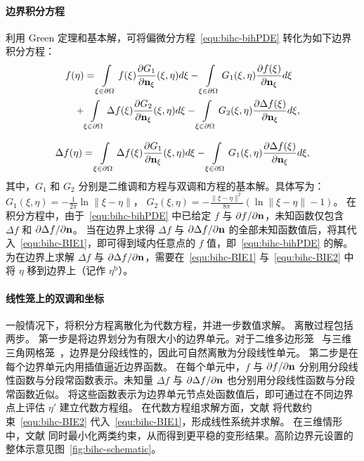 \paragraph{边界积分方程}
利用 Green 定理和基本解，可将偏微分方程~\eqref{equ:bihc-bihPDE} 转化为如下边界积分方程：
\begin{equation}\label{equ:bihc-BIE1}
\begin{aligned}
f(\eta) &=
\int\limits_{\xi \in \partial \Omega}
f(\xi) \frac{\partial G_1}{\partial \mathbf{n}_{\xi}}(\xi, \eta)d\xi -
\int\limits_{\xi \in \partial \Omega}
G_1(\xi, \eta) \frac{\partial f(\xi)}{\partial \mathbf{n}_{\xi}}d\xi \\
+ &\int\limits_{\xi \in \partial \Omega}
\Delta f(\xi) \frac{\partial G_2}{\partial \mathbf{n}_{\xi}}(\xi, \eta)d\xi -
\int\limits_{\xi \in \partial \Omega}
G_2(\xi, \eta) \frac{\partial \Delta f(\xi)}{\partial \mathbf{n}_{\xi}}d\xi,
\end{aligned}
\end{equation}

\begin{equation}\label{equ:bihc-BIE2}
\begin{aligned}
\Delta f(\eta) =
\int\limits_{\xi \in \partial \Omega}
\Delta f(\xi) \frac{\partial G_1}{\partial \mathbf{n}_{\xi}}(\xi, \eta)d\xi -
\int\limits_{\xi \in \partial \Omega}
G_1(\xi, \eta) \frac{\partial \Delta f(\xi)}{\partial \mathbf{n}_{\xi}}d\xi,
\end{aligned}
\end{equation}
其中，$G_1$ 和 $G_2$ 分别是二维调和方程与双调和方程的基本解。具体写为：
$G_1(\xi,\eta)=-\frac{1}{2 \pi}\ln\|\xi-\eta\|$，
$G_2(\xi,\eta)=-\frac{\|\xi-\eta\|^2}{8 \pi}(\ln\|\xi-\eta\|-1)$。
%
在积分方程中，由于~\eqref{equ:bihc-bihPDE} 中已给定 \(f\) 与 \(\partial f/\partial \mathbf{n}\)，未知函数仅包含 \(\Delta f\) 和 \(\partial \Delta f/\partial \mathbf{n}\)。
当在边界上求得 \(\Delta f\) 与 \(\partial \Delta f/\partial \mathbf{n}\) 的全部未知函数值后，将其代入~\eqref{equ:bihc-BIE1}，即可得到域内任意点的 $f$ 值，即~\eqref{equ:bihc-bihPDE} 的解。
%
为在边界上求解 \(\Delta f\) 与 \(\partial \Delta f/\partial \mathbf{n}\)，需要在~\eqref{equ:bihc-BIE1} 与~\eqref{equ:bihc-BIE2} 中将 \(\eta\) 移到边界上（记作 \(\eta^{\text{b}}\)）。

\paragraph{线性笼上的双调和坐标}
一般情况下，将积分方程离散化为代数方程，并进一步数值求解。
%
离散过程包括两步。
第一步是将边界划分为有限大小的边界单元。对于二维多边形笼~\cite{Weber2012} 与三维三角网格笼~\cite{thiery2024biharmonic}，边界是分段线性的，因此可自然离散为分段线性单元。
%
第二步是在每个边界单元内用插值逼近边界函数。
在每个单元中，\(f\) 与 \(\partial f/\partial \mathbf{n}\) 分别用分段线性函数与分段常函数表示。未知量 \(\Delta f\) 与 \(\partial \Delta f/\partial \mathbf{n}\) 也分别用分段线性函数与分段常函数近似。
%
将这些函数表示为边界单元节点处函数值后，即可通过在不同边界点上评估 \(\eta'\) 建立代数方程组。
%
在代数方程组求解方面，文献\cite{Weber2012} 将代数约束~\eqref{equ:bihc-BIE2} 代入~\eqref{equ:bihc-BIE1}，形成线性系统并求解。
在三维情形中，文献\cite{thiery2024biharmonic} 同时最小化两类约束，从而得到更平稳的变形结果。高阶边界元设置的整体示意见图~\ref{fig:bihc-schematic}。

